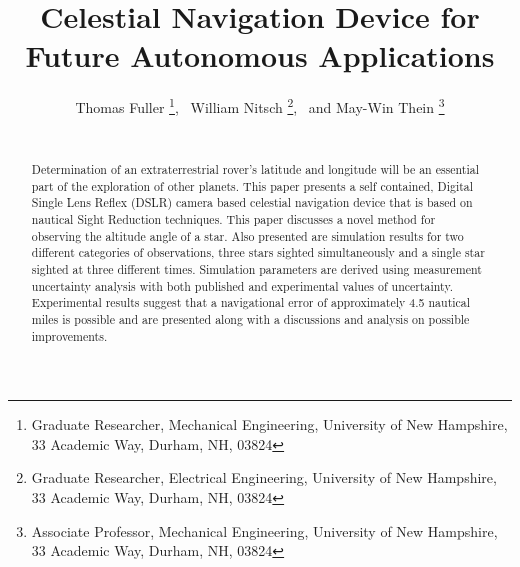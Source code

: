 \documentclass[]{aiaa-tc}%
\title{Celestial Navigation Device for Future Autonomous Applications}
\author{
 Thomas Fuller%
    \thanks{Graduate Researcher, Mechanical Engineering, University of New Hampshire, 33 Academic Way, Durham, NH, 03824},
    \
 William Nitsch%
    \thanks{Graduate Researcher, Electrical Engineering, University of New Hampshire, 33 Academic Way, Durham, NH, 03824},
  \ and May-Win Thein%
    \thanks{Associate Professor, Mechanical Engineering, University of New Hampshire, 33 Academic Way, Durham, NH, 03824}
  \\
  {\normalsize\itshape}\\
 }
\begin{document}
\maketitle

\begin{abstract}
Determination of an extraterrestrial rover's latitude and longitude will be an essential part of the exploration of other planets.  This paper presents a self contained, Digital Single Lens Reflex (DSLR) camera based celestial navigation device that is based on nautical Sight Reduction techniques. This paper discusses a novel method for observing the altitude angle of a star. Also presented are simulation results for two different categories of observations, three stars sighted simultaneously and a single star sighted at three different times.  Simulation parameters are derived using measurement uncertainty analysis with both published and experimental values of uncertainty.  Experimental results suggest that a navigational error of approximately 4.5 nautical miles is possible and are presented along with a discussions and analysis on possible improvements.  
\end{abstract}

%  
\end{document}
